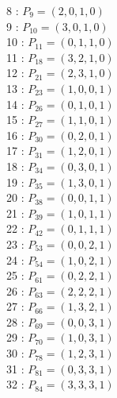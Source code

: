 \documentclass{article}
\begin{document}
{\begin{multicols}{3}
8 : $P_{9}=( 2, 0, 1, 0 )$\\
9 : $P_{10}=( 3, 0, 1, 0 )$\\
10 : $P_{11}=( 0, 1, 1, 0 )$\\
11 : $P_{18}=( 3, 2, 1, 0 )$\\
12 : $P_{21}=( 2, 3, 1, 0 )$\\
13 : $P_{23}=( 1, 0, 0, 1 )$\\
14 : $P_{26}=( 0, 1, 0, 1 )$\\
15 : $P_{27}=( 1, 1, 0, 1 )$\\
16 : $P_{30}=( 0, 2, 0, 1 )$\\
17 : $P_{31}=( 1, 2, 0, 1 )$\\
18 : $P_{34}=( 0, 3, 0, 1 )$\\
19 : $P_{35}=( 1, 3, 0, 1 )$\\
20 : $P_{38}=( 0, 0, 1, 1 )$\\
21 : $P_{39}=( 1, 0, 1, 1 )$\\
22 : $P_{42}=( 0, 1, 1, 1 )$\\
23 : $P_{53}=( 0, 0, 2, 1 )$\\
24 : $P_{54}=( 1, 0, 2, 1 )$\\
25 : $P_{61}=( 0, 2, 2, 1 )$\\
26 : $P_{63}=( 2, 2, 2, 1 )$\\
27 : $P_{66}=( 1, 3, 2, 1 )$\\
28 : $P_{69}=( 0, 0, 3, 1 )$\\
29 : $P_{70}=( 1, 0, 3, 1 )$\\
30 : $P_{78}=( 1, 2, 3, 1 )$\\
31 : $P_{81}=( 0, 3, 3, 1 )$\\
32 : $P_{84}=( 3, 3, 3, 1 )$\\
\end{multicols}


%


%


}%
\end{document}

